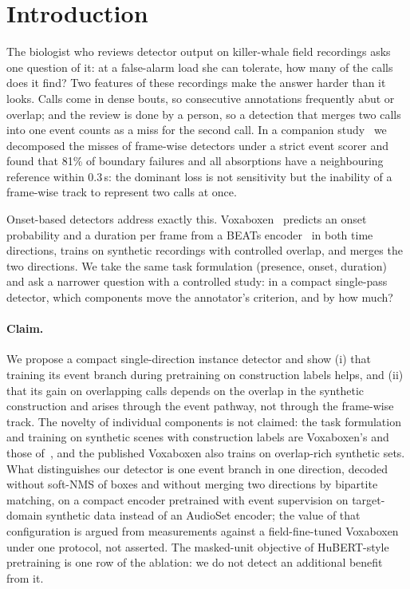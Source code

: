 \documentclass[10pt,twocolumn]{article}
\begin{document}
\section{Introduction}
The biologist who reviews detector output on killer-whale field recordings asks one question of it: at a false-alarm load she can tolerate, how many of the calls does it find? Two features of these recordings make the answer harder than it looks. Calls come in dense bouts, so consecutive annotations frequently abut or overlap; and the review is done by a person, so a detection that merges two calls into one event counts as a miss for the second call. In a companion study~\citep{sheipak2026what} we decomposed the misses of frame-wise detectors under a strict event scorer and found that 81\% of boundary failures and all absorptions have a neighbouring reference within 0.3\,s: the dominant loss is not sensitivity but the inability of a frame-wise track to represent two calls at once.

Onset-based detectors address exactly this. Voxaboxen~\citep{mahon2025voxaboxen} predicts an onset probability and a duration per frame from a BEATs encoder~\citep{chen2023beats} in both time directions, trains on synthetic recordings with controlled overlap, and merges the two directions. We take the same task formulation (presence, onset, duration) and ask a narrower question with a controlled study: in a compact single-pass detector, which components move the annotator's criterion, and by how much?

\paragraph{Claim.} We propose a compact single-direction instance detector and show (i) that training its event branch during pretraining on construction labels helps, and (ii) that its gain on overlapping calls depends on the overlap in the synthetic construction and arises through the event pathway, not through the frame-wise track. The novelty of individual components is not claimed: the task formulation and training on synthetic scenes with construction labels are Voxaboxen's and those of~\citep{hoffman2025synthetic}, and the published Voxaboxen also trains on overlap-rich synthetic sets. What distinguishes our detector is one event branch in one direction, decoded without soft-NMS of boxes and without merging two directions by bipartite matching, on a compact encoder pretrained with event supervision on target-domain synthetic data instead of an AudioSet encoder; the value of that configuration is argued from measurements against a field-fine-tuned Voxaboxen under one protocol, not asserted. The masked-unit objective of HuBERT-style pretraining is one row of the ablation: we do not detect an additional benefit from it.
\end{document}
